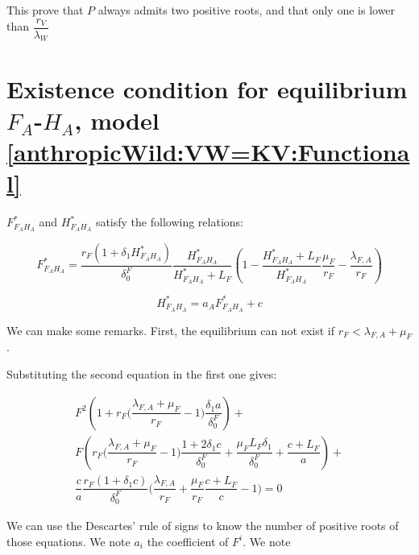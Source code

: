 \documentclass{article}
\newcommand{\lfa}{\lambda_{F, A}}
\newcommand{\lfv}{\lambda_{W}}
\newcommand{\df}{\delta_0^F}
\begin{document}
\begin{appendices}
This prove that $P$ always admits two positive roots, and that only one is lower than $\dfrac{r_V}{\lfv}$


\section{Existence condition for equilibrium $F_A$-$H_A$, model \eqref{anthropicWild:VW=KV:Functional}}

$F^*_{F_AH_A}$ and $H^*_{F_AH_A}$ satisfy the following relations:

$$
F^*_{F_AH_A} = \dfrac{r_F(1+\delta_1 H^*_{F_AH_A})}{\df}\dfrac{H^*_{F_AH_A}}{H^*_{F_AH_A} + L_F}\left(1 - \dfrac{H^*_{F_AH_A} + L_F}{H^*_{F_AH_A}}\dfrac{\mu_F}{r_F} - \dfrac{\lfa}{r_F}\right)
$$

$$
H^*_{F_AH_A} = a_A F^*_{F_AH_A} + c
$$

We can make some remarks. First, the equilibrium can not exist if $r_F < \lfa + \mu_F$.

Substituting the second equation in the first one gives:

\begin{multline}
F^2 \left(1 + r_F\Big(\dfrac{\lfa + \mu_F}{r_F} -1\Big) \dfrac{\delta_1 a}{\df}\right) + \\
F \left( r_F \Big(\dfrac{\lfa + \mu_F}{r_F} - 1\Big) \dfrac{1 + 2\delta_1 c}{\df} +\dfrac{\mu_F L_F  \delta_1}{\df} + \dfrac{c + L_F}{a} \right) + \\
 \dfrac{c}{a} \dfrac{r_F (1+ \delta_1 c)}{\df}\Big( \dfrac{\lfa}{r_F} + \dfrac{\mu_F}{r_F}\dfrac{c + L_F}{c} -1 \Big) = 0
\label{anthropic:Functional:FH:eqF}
\end{multline}



We can use the Descartes' rule of signs to know the number of positive roots of those equations. We note $a_i$ the coefficient of $F^i$. 
We note



\end{appendices}
\end{document}
